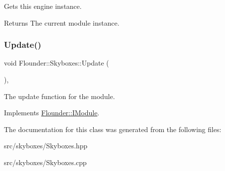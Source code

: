 Gets this engine instance. 

\begin{DoxyReturn}{Returns}
The current module instance. 
\end{DoxyReturn}
\mbox{\label{class_flounder_1_1_skyboxes_a74932667f6a24ce9518d01e4f6a26351}} 
\subsubsection{\texorpdfstring{Update()}{Update()}}
{\footnotesize\ttfamily void Flounder\+::\+Skyboxes\+::\+Update (\begin{DoxyParamCaption}{ }\end{DoxyParamCaption})\hspace{0.3cm}{\ttfamily [override]}, {\ttfamily [virtual]}}



The update function for the module. 



Implements \hyperlink{class_flounder_1_1_i_module_a1812bb03a6990e4698a10c043fa25fde}{Flounder\+::\+I\+Module}.



The documentation for this class was generated from the following files\+:\begin{DoxyCompactItemize}
\item 
src/skyboxes/Skyboxes.\+hpp\item 
src/skyboxes/Skyboxes.\+cpp\end{DoxyCompactItemize}
